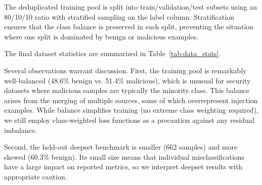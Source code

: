 \documentclass[12pt, letterpaper]{article}   %
\begin{document}
The deduplicated training pool is split into train/validation/test subsets using an 80/10/10 ratio with stratified sampling on the label column. Stratification ensures that the class balance is preserved in each split, preventing the situation where one split is dominated by benign or malicious examples.

The final dataset statistics are summarized in Table~\ref{tab:data_stats}.

\begin{table}[h!]
    \centering
    \renewcommand{\arraystretch}{1.5}
    \caption{Label distribution across all data splits. The training pool (train/val/test) exhibits near-perfect 50/50 balance after deduplication and stratified splitting. The held-out deepset benchmark has a 60/40 benign/malicious split, reflecting its original composition.}
    \label{tab:data_stats}
\end{table}

Several observations warrant discussion. First, the training pool is remarkably well-balanced (48.6\% benign vs. 51.4\% malicious), which is unusual for security datasets where malicious samples are typically the minority class. This balance arises from the merging of multiple sources, some of which overrepresent injection examples. While balance simplifies training (no extreme class weighting required), we still employ class-weighted loss functions as a precaution against any residual imbalance.

Second, the held-out deepset benchmark is smaller (662 samples) and more skewed (60.3\% benign). Its small size means that individual misclassifications have a large impact on reported metrics, so we interpret deepset results with appropriate caution.
\end{document}
